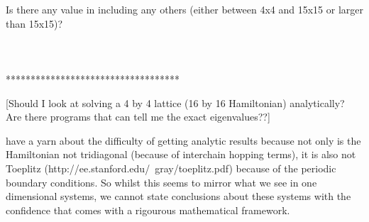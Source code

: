 \documentclass[a4paper,10pt]{article}
\theoremstyle{plain}
\begin{document}
Is there any value in including any others (either between 4x4
and 15x15 or larger than 15x15)?\\\\\\\\ 

***********************************


[Should I look at solving a 4 by 4 lattice (16 by 16 Hamiltonian) analytically?
Are there programs that can tell me the exact eigenvalues??]


have a yarn about the difficulty of getting analytic results because not only 
is the Hamiltonian not tridiagonal (because of interchain hopping terms), it 
is also not Toeplitz (http://ee.stanford.edu/~gray/toeplitz.pdf) because of 
the periodic boundary conditions. So whilst this seems to mirror what we see in
one dimensional systems, we cannot state conclusions about these systems with
the confidence that comes with a rigourous mathematical framework.


\newpage




\end{document}
